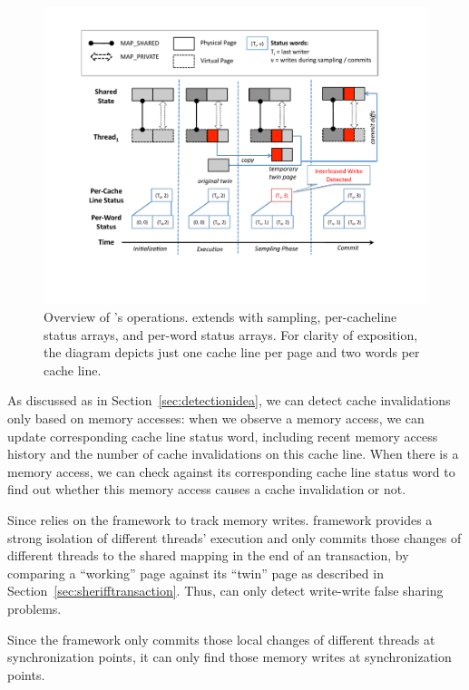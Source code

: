 \begin{figure}[!t]
\centering
\includegraphics[width=6in]{sheriff/figure/sheriffdetective.pdf}
\caption{
Overview of \SheriffDetect{}’s operations. \SheriffDetect{} extends \Sheriff{} with sampling, per-cacheline status arrays, and per-word status arrays. For clarity of exposition, the diagram depicts just one cache line per page and two words per cache line.\label{fig:sheriffdetect}}
\end{figure}

As discussed as in Section~\ref{sec:detectionidea}, we can detect cache invalidations only based on memory accesses: when we observe a memory access, we can update corresponding cache line status word, including recent memory access history and the number of cache invalidations on this cache line. When there is a memory access, we can check against its corresponding cache line status word to find out whether this memory access causes a cache invalidation or not. 

Since \SheriffDetect{} relies on the \sheriff{} framework to track memory writes. \sheriff{} framework provides a strong isolation of different threads' execution and only commits those changes of different threads to the shared mapping in the end of an transaction, by comparing a ``working'' page against its ``twin'' page as described in Section~\ref{sec:sherifftransaction}. Thus, \sheriffDetect{} can only detect write-write false sharing problems. 

Since the \sheriff{} framework only commits those local changes of different threads at synchronization points, it can only find those memory writes at synchronization points. 

